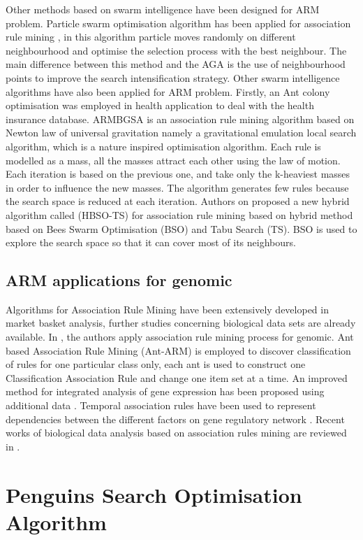 \documentclass[preprint,12pt]{elsarticle}
\begin{document}
Other methods based on swarm intelligence have been designed for ARM problem. 
Particle swarm optimisation algorithm has been applied for association rule mining \cite{12}, 
in this algorithm particle moves randomly on different neighbourhood and optimise the selection process with the best neighbour. 
The main difference between this method and the AGA is the use of neighbourhood points to improve the search intensification strategy. 
Other swarm intelligence algorithms have also been applied for ARM problem. Firstly, an Ant colony optimisation \cite{20} was employed in health application 
to deal with the health insurance database. ARMBGSA \cite{21} is an association rule mining algorithm based on Newton law of universal gravitation namely 
a gravitational emulation local search algorithm, which is a nature inspired optimisation algorithm. Each rule is modelled as a mass, all the masses attract each other using the law of motion. Each iteration is based on the 
previous one, and take only the k-heaviest masses in order to influence the new masses. The algorithm generates few rules because 
the search space is reduced at each iteration. 
Authors on \cite{22} proposed a new hybrid algorithm called (HBSO-TS) for association rule mining based on hybrid method based on 
Bees Swarm Optimisation (BSO) and Tabu Search (TS). BSO is used to explore the search space so that it can cover most of its neighbours.
 
\subsection{ARM applications for genomic}
Algorithms for Association Rule Mining have been extensively developed in market basket analysis, further studies concerning  biological data sets are already available.
 In \cite{23}, the authors apply association rule mining process for genomic. 
 Ant based Association Rule Mining (Ant-ARM) is employed to discover classification of rules for one particular class only, each ant is used to construct one  Classification Association Rule and change one item set at a time. An improved method for integrated analysis of gene expression has been 
 proposed using additional data \cite{24}. Temporal association rules have been used to represent dependencies between the different factors 
 on gene regulatory network \cite{25}. Recent works of biological data analysis based on association rules mining are reviewed in \cite{26}.

\section{Penguins Search Optimisation Algorithm }
\end{document}
